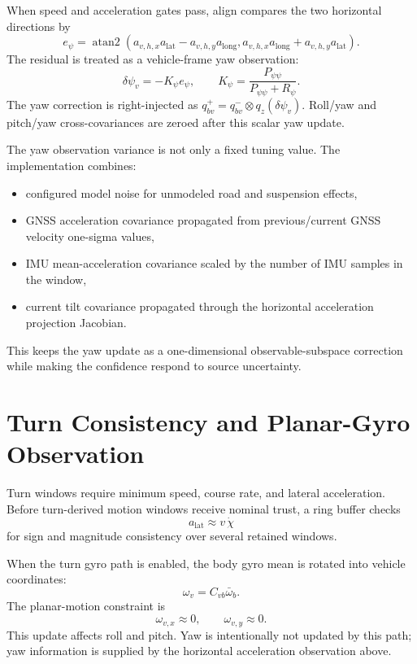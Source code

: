 \documentclass[11pt]{article}
\begin{document}
When speed and acceleration gates pass, align compares the two horizontal
directions by
\begin{equation}
  e_\psi =
  \operatorname{atan2}
  \left(
    a_{v,h,x}a_{\mathrm{lat}} - a_{v,h,y}a_{\mathrm{long}},
    a_{v,h,x}a_{\mathrm{long}} + a_{v,h,y}a_{\mathrm{lat}}
  \right).
\end{equation}
The residual is treated as a vehicle-frame yaw observation:
\begin{equation}
  \delta\psi_v=-K_\psi e_\psi,\qquad
  K_\psi=\frac{P_{\psi\psi}}{P_{\psi\psi}+R_\psi}.
\end{equation}
The yaw correction is right-injected as \(q_{bv}^{+}=q_{bv}^{-}\otimes
q_z(\delta\psi_v)\). Roll/yaw and pitch/yaw cross-covariances are zeroed after
this scalar yaw update.

The yaw observation variance is not only a fixed tuning value. The
implementation combines:
\begin{itemize}[leftmargin=1.5em]
\item configured model noise for unmodeled road and suspension effects,
\item GNSS acceleration covariance propagated from previous/current GNSS
velocity one-sigma values,
\item IMU mean-acceleration covariance scaled by the number of IMU samples in
the window,
\item current tilt covariance propagated through the horizontal acceleration
projection Jacobian.
\end{itemize}
This keeps the yaw update as a one-dimensional observable-subspace correction
while making the confidence respond to source uncertainty.

\section{Turn Consistency and Planar-Gyro Observation}

Turn windows require minimum speed, course rate, and lateral acceleration.
Before turn-derived motion windows receive nominal trust, a ring buffer checks
\begin{equation}
  a_{\mathrm{lat}}\approx v\,\dot\chi
\end{equation}
for sign and magnitude consistency over several retained windows.

When the turn gyro path is enabled, the body gyro mean is rotated into vehicle
coordinates:
\begin{equation}
  \omega_v=C_{vb}\bar\omega_b .
\end{equation}
The planar-motion constraint is
\begin{equation}
  \omega_{v,x}\approx 0,\qquad \omega_{v,y}\approx 0.
\end{equation}
This update affects roll and pitch. Yaw is intentionally not updated by this
path; yaw information is supplied by the horizontal acceleration observation
above.
\end{document}
